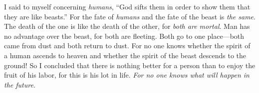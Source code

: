 \begin{biblechapter}
\verse I said to myself concerning \textit{humans}, “God sifts them in order to show them that they are like beasts.”
\verse For the fate of \textit{humans} and the fate of the beast is \textit{the same}. The death of the one is like the death of the other, for \textit{both are mortal}. Man has no advantage over the beast, for both are fleeting.
\verse Both go to one place—both came from dust and both return to dust.
\verse For no one knows whether the spirit of a human ascends to heaven and whether the spirit of the beast descends to the ground!
\verse So I concluded that there is nothing better for a person than to enjoy the fruit of his labor, for this is his lot in life. \textit{For no one knows what will happen in the future.}
\end{biblechapter}


